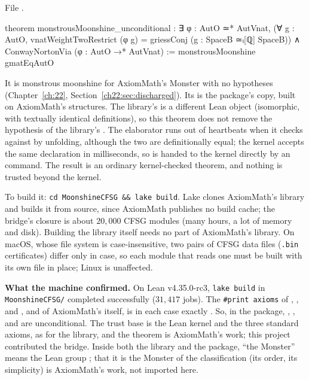 \noindent File .
\begin{leancode}
theorem monstrousMoonshine_unconditional :
    ∃ φ : AutO ≃* AutVnat,
      (∀ g : AutO, vnatWeightTwoRestrict (φ g) = griessConj (g : SpaceB ≃ₗ[ℚ] SpaceB)) ∧
        ConwayNortonVia (φ : AutO →* AutVnat) :=
  monstrousMoonshine gmatEqAutO
\end{leancode}
It is monstrous moonshine for AxiomMath's Monster  with no hypotheses (Chapter~\ref{ch:22},
Section~\ref{ch22:sec:discharged}). Its  is the package's copy, built on AxiomMath's structures. The
library's  is a different Lean object (isomorphic, with textually identical definitions), so this theorem
does not remove the hypothesis of the library's . The elaborator runs out of heartbeats when it checks
 against  by unfolding, although the two are definitionally equal; the kernel
accepts the same declaration in milliseconds, so  is handed to the kernel directly by an
 command. The result is an ordinary kernel-checked theorem, and nothing is trusted beyond the kernel.

To build it: \texttt{cd MoonshineCFSG \&\& lake build}. Lake clones AxiomMath's library and builds it from source,
since AxiomMath publishes no build cache; the bridge's closure is about $20{,}000$ CFSG modules (many hours, a lot of
memory and disk). Building the library itself needs no part of AxiomMath's library. On macOS, whose file system is case-insensitive, two pairs of CFSG data files (\texttt{.bin} certificates)
differ only in case, so each module that reads one must be built with its own file in place; Linux is unaffected.

\textbf{What the machine confirmed.} On Lean v4.35.0-rc3, \texttt{lake build} in \texttt{MoonshineCFSG/} completed
successfully ($31{,}417$ jobs). The \texttt{\#print axioms} of , ,
 and , and of AxiomMath's
 itself, is in each case exactly
. So, in the package, ,
,  and  are
unconditional. The trust base is the Lean kernel and the three standard axioms, as for the library, and
the theorem  is AxiomMath's work; this project contributed the bridge.
Inside both the library and the package, ``the Monster'' means the Lean group ; that it is the Monster of the classification
(its order, its simplicity) is AxiomMath's work, not imported here.

